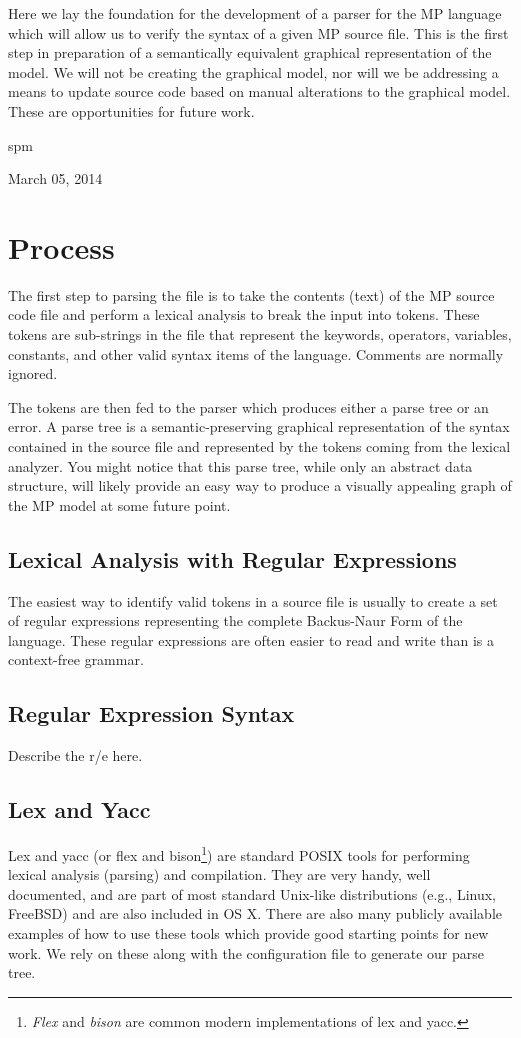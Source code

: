 \documentclass[journal]{IEEEtran}
\begin{document}
Here we lay the foundation for the development of a parser for the
MP language which will allow us to verify the syntax of a given MP source file. 
This is the first step in preparation of a semantically equivalent graphical
representation of the model.  We will not be creating the graphical model, nor will we
be addressing a means to update source code based on manual alterations to the
graphical model.  These are opportunities for future work.

\hfill spm
 
\hfill March 05, 2014

\section{Process}
The first step to parsing the file is to take the contents (text) of the 
MP source code file and perform a lexical analysis
to break the input into tokens.  These tokens are sub-strings in the file that 
represent the keywords, operators, variables, constants, and other valid syntax 
items of the language.  Comments are normally ignored.

The tokens are then fed to the parser which produces either a parse tree or an error.
A parse tree is a semantic-preserving graphical representation of the syntax contained
in the source file and represented by the tokens coming from the lexical analyzer.  You 
might notice that this parse tree, while only an abstract data structure, will likely provide an
easy way to produce a visually appealing graph of the MP model at some future point.


\subsection{Lexical Analysis with Regular Expressions}
The easiest way to identify valid tokens in a source file is usually to create 
a set of regular expressions representing the complete Backus-Naur Form of the 
language.  These regular expressions are often easier to read and write than 
is a context-free grammar.


\subsection{Regular Expression Syntax}
Describe the r/e here.


\subsection{Lex and Yacc}
Lex and yacc (or flex and bison\footnote{\emph{Flex} and \emph{bison}
are common modern implementations of lex and yacc.}) 
are standard POSIX tools for performing lexical analysis (parsing) and compilation.
They are very handy, well documented, and are part of most standard 
Unix-like distributions (e.g., Linux, FreeBSD) and are 
also included in OS X.  There are also many publicly available examples of how to use these
tools which provide good starting points for new work.  We rely on these along with the
configuration file to generate our parse tree.
\end{document}
